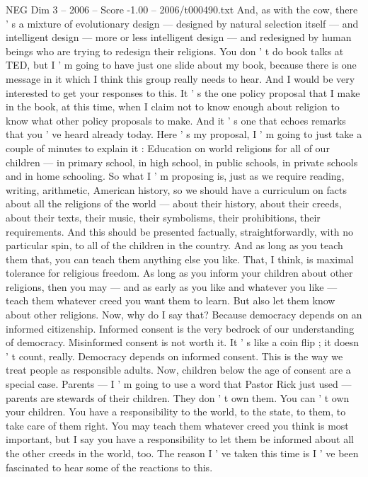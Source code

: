 \begin{textsample}{NEG Dim 3 – 2006 – Score -1.00 – 2006/t000490.txt}
And, as with the cow, there ' s a mixture of evolutionary design — designed by natural selection itself — and intelligent design — more or less intelligent design — and redesigned by human beings who are trying to redesign their religions.
You don ' t do book talks at TED, but I ' m going to have just one slide about my book, because there is one message in it which I think this group really needs to hear.
And I would be very interested to get your responses to this.
It ' s the one policy proposal that I make in the book, at this time, when I claim not to know enough about religion to know what other policy proposals to make.
And it ' s one that echoes remarks that you ' ve heard already today.
Here ' s my proposal, I ' m going to just take a couple of minutes to explain it : Education on world religions for all of our children — in primary school, in high school, in public schools, in private schools and in home schooling.
So what I ' m proposing is, just as we require reading, writing, arithmetic, American history, so we should have a curriculum on facts about all the religions of the world — about their history, about their creeds, about their texts, their music, their symbolisms, their prohibitions, their requirements.
And this should be presented factually, straightforwardly, with no particular spin, to all of the children in the country.
And as long as you teach them that, you can teach them anything else you like.
That, I think, is maximal tolerance for religious freedom.
As long as you inform your children about other religions, then you may — and as early as you like and whatever you like — teach them whatever creed you want them to learn.
But also let them know about other religions.
Now, why do I say that?
Because democracy depends on an informed citizenship.
Informed consent is the very bedrock of our understanding of democracy.
Misinformed consent is not worth it.
It ' s like a coin flip ; it doesn ' t count, really.
Democracy depends on informed consent.
This is the way we treat people as responsible adults.
Now, children below the age of consent are a special case.
Parents — I ' m going to use a word that Pastor Rick just used — parents are stewards of their children.
They don ' t own them.
You can ' t own your children.
You have a responsibility to the world, to the state, to them, to take care of them right.
You may teach them whatever creed you think is most important, but I say you have a responsibility to let them be informed about all the other creeds in the world, too.
The reason I ' ve taken this time is I ' ve been fascinated to hear some of the reactions to this.

\end{textsample}
